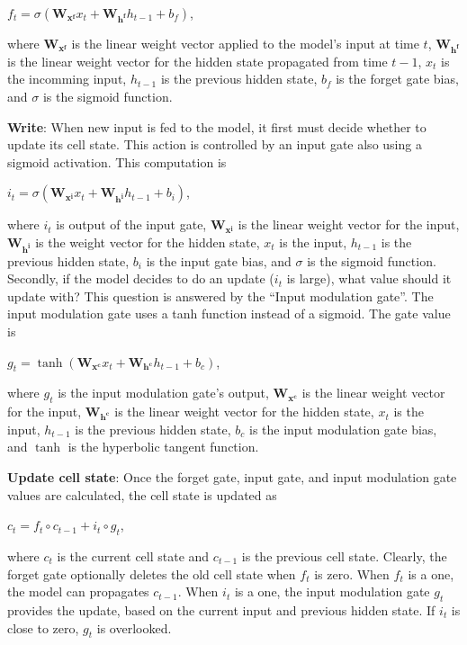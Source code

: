 \hfil $ f_t = \sigma(\mathbf{W_{x^f}}x_t + \mathbf{W_{h^f}}h_{t-1} + b_f) $, \par

where $\mathbf{W_{x^f}}$ is the linear weight vector applied to the model's input at time $t$, $\mathbf{W_{h^f}}$ is the linear weight vector for the hidden state propagated from time $t-1$, $x_t$ is the incomming input, $h_{t-1}$ is the previous hidden state, $b_f$ is the forget gate bias, and $\sigma$ is the sigmoid function.


\textbf{Write}: When new input is fed to the model, it first must decide whether to update its cell state. This action is controlled by an input gate also using a sigmoid activation. This computation is

\hfil $ i_t = \sigma(\mathbf{W_{x^i}}x_t + \mathbf{W_{h^i}}h_{t-1} + b_i) $, \par

where $i_t$ is output of the input gate, $\mathbf{W_{x^i}}$ is the linear weight vector for the input, $\mathbf{W_{h^i}}$ is the weight vector for the hidden state, $x_t$ is the input, $h_{t-1}$ is the previous hidden state, $b_i$ is the input gate bias, and $\sigma$ is the sigmoid function. Secondly, if the model decides to do an update ($i_t$ is large), what value should it update with? This question is answered by the “Input modulation gate”. The input modulation gate uses a tanh function instead of a sigmoid. The gate value is

\hfil $ g_t = \tanh(\mathbf{W_{x^c}}x_t + \mathbf{W_{h^c}}h_{t-1} + b_c) $, \par

where $g_t$ is the input modulation gate's output, $\mathbf{W_{x^c}}$ is the linear weight vector for the input, $\mathbf{W_{h^c}}$ is the linear weight vector for the hidden state, $x_t$ is the input, $h_{t-1}$ is the previous hidden state, $b_c$ is the input modulation gate bias, and $\tanh$ is the hyperbolic tangent function.


\textbf{Update cell state}: Once the forget gate, input gate, and input modulation gate values are calculated, the cell state is updated as

\hfil $c_t = f_t \circ c_{t-1} + i_t \circ g_t $, \par

where $c_t$ is the current cell state and $c_{t-1}$ is the previous cell state. Clearly, the forget gate optionally deletes the old cell state when $f_t$ is zero. When $f_t$ is a one, the model can propagates $c_{t -1}$. When $i_t$ is a one, the input modulation gate $g_t$ provides the update, based on the current input and previous hidden state. If $i_t$ is close to zero, $g_t$ is overlooked.


